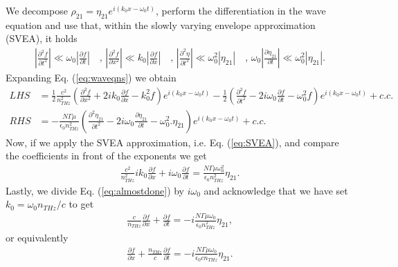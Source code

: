 \documentclass[preprint,secnumarabic,amssymb, nobibnotes, aip, prd]{revtex4-1}
\def\p{\partial}
\begin{document}
We decompose $\rho_{21}=\eta_{21}e^{i(k_0x-\omega_0t)}$, perform the differentiation in the wave equation and use that, within the slowly varying envelope approximation (SVEA), it holds
\begin{align}
\label{eq:SVEA}
\left |\frac{\p^2 f}{\p t^2}\right | \ll \omega_0\left|\frac{\p f}{\p t}\right| \quad \text{, } \left |\frac{\p^2 f}{\p x^2}\right | \ll k_0\left|\frac{\p f}{\p x}\right| \quad \text{, } \left |\frac{\p^2 \eta}{\p t^2}\right | \ll \omega_0^2 \left| \eta_{21}\right| \quad \text{, } \omega_0 \left| \frac{\p \eta_{21}}{\p t}\right| \ll  \omega_0^2\left|\eta_{21}\right|.
\end{align}
Expanding Eq. (\ref{eq:waveqns}) we obtain
\begin{align}
LHS &= \frac{1}{2} \frac{c^2}{n_{THz}^2} \left(\frac{\p^2 f}{\p x^2} +2ik_0 \frac{\p f}{\p x} -k_0^2 f\right)e^{i(k_0x-\omega_0t)} - \frac{1}{2}\left(\frac{\p^2 f}{\p t^2} -2i\omega_0 \frac{\p f}{\p t} -\omega_0^2 f\right)e^{i(k_0x-\omega_0t)} + c.c. \nonumber \\
RHS &= -\frac{N\Gamma\mu}{\epsilon_0 n_{THz}^2} \left(\frac{\p^2 \eta_{21}}{\p t^2} -2i\omega_0 \frac{\p \eta_{21}}{\p t} -\omega_0^2. \eta_{21}\right)e^{i(k_0x-\omega_0t)}+c.c.
\end{align}
Now, if we apply the SVEA approximation, i.e. Eq. (\ref{eq:SVEA}), and compare the coefficients in front of the exponents we get
\begin{align}
\label{eq:almostdone}
\frac{c^2}{n_{THz}^2}ik_0 \frac{\p f}{\p x}+i\omega_0 \frac{\p f}{\p t} = \frac{N\Gamma\mu\omega_0^2}{\epsilon_0 n_{THz}^2}\eta_{21}.
\end{align}
Lastly, we divide Eq. (\ref{eq:almostdone}) by $i\omega_0$ and acknowledge that we have set $k_0 = \omega_0 n_{THz}/c$ to get
\begin{align}
\label{eq:almostdone2}
\frac{c}{n_{THz}} \frac{\p f}{\p x}+ \frac{\p f}{\p t} = -i\frac{N\Gamma\mu\omega_0}{\epsilon_0 n_{THz}^2}\eta_{21},
\end{align}
or equivalently
\begin{align}
\label{eq:almostdone3}
\frac{\p f}{\p x}+ \frac{n_{THz}}{c} \frac{\p f}{\p t} = -i\frac{N\Gamma\mu\omega_0}{\epsilon_0 c n_{THz}}\eta_{21}.
\end{align}





\end{document}
